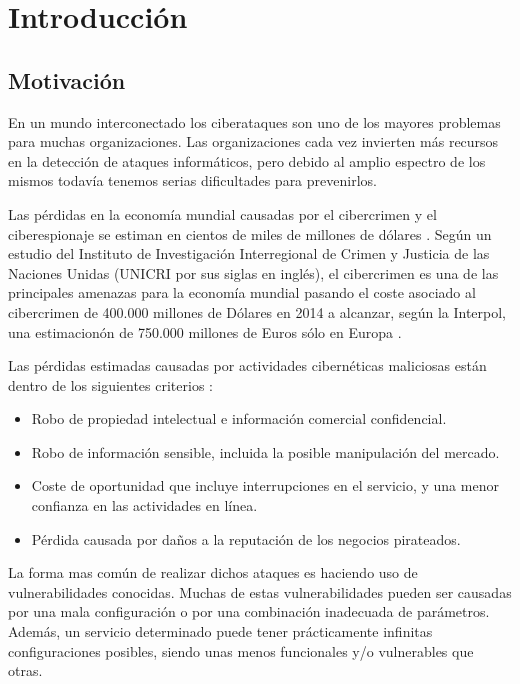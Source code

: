 \chapter{Introducción}

\section{Motivación}

En un mundo interconectado los ciberataques son uno de los mayores problemas para muchas organizaciones. Las organizaciones cada vez invierten más recursos en la detección de ataques informáticos, pero debido al amplio espectro de los mismos todavía tenemos serias dificultades para prevenirlos.

\bigskip
Las pérdidas en la economía mundial causadas por el cibercrimen y el ciberespionaje se estiman en cientos de miles de millones de dólares \cite{herrero_cibercrimen_2015}. Según un estudio del Instituto de Investigación Interregional de Crimen y Justicia de las Naciones Unidas (UNICRI por sus siglas en inglés), el cibercrimen es una de las principales amenazas para la economía mundial pasando el coste asociado al cibercrimen de 400.000 millones de Dólares en 2014 \cite{zappa_cybercrime:_2014} a alcanzar, según la Interpol, una estimacionón de 750.000 millones de Euros sólo en Europa \cite{gil_cuanto_2018}.

\bigskip
Las pérdidas estimadas causadas por actividades cibernéticas maliciosas están dentro de los siguientes criterios \cite{armin_2020_2015}:

\begin{itemize}
  \item Robo de propiedad intelectual e información comercial confidencial.
  \item Robo de información sensible, incluida la posible manipulación del mercado.
  \item Coste de oportunidad que incluye interrupciones en el servicio, y una menor confianza en las actividades en línea.
  \item Pérdida causada por daños a la reputación de los negocios pirateados.
\end{itemize}

\bigskip
La forma mas común de realizar dichos ataques es haciendo uso de vulnerabilidades conocidas. Muchas de estas vulnerabilidades pueden ser causadas por una mala configuración o por una combinación inadecuada de parámetros. Además, un servicio determinado puede tener prácticamente infinitas configuraciones posibles, siendo unas menos funcionales y/o vulnerables que otras.

